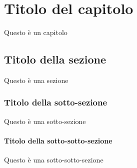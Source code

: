 \documentclass{report}
\begin{document}
    \chapter{Titolo del capitolo}
    Questo \`e un capitolo
    \section{Titolo della sezione}
    Questo \`e una sezione
    \subsection{Titolo della sotto-sezione}
    Questo \`e una sotto-sezione
    \subsubsection{Titolo della sotto-sotto-sezione}
    Questo \`e una sotto-sotto-sezione
\end{document}
